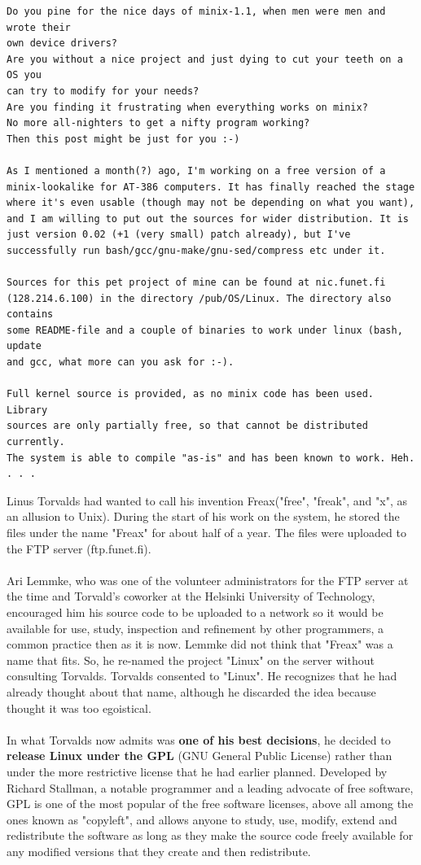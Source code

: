 \documentclass[11pt]{article}
\begin{document}
\begin{verbatim}
Do you pine for the nice days of minix-1.1, when men were men and wrote their
own device drivers? 
Are you without a nice project and just dying to cut your teeth on a OS you
can try to modify for your needs? 
Are you finding it frustrating when everything works on minix? 
No more all-nighters to get a nifty program working? 
Then this post might be just for you :-)

As I mentioned a month(?) ago, I'm working on a free version of a 
minix-lookalike for AT-386 computers. It has finally reached the stage where it's even usable (though may not be depending on what you want), and I am willing to put out the sources for wider distribution. It is just version 0.02 (+1 (very small) patch already), but I've successfully run bash/gcc/gnu-make/gnu-sed/compress etc under it.

Sources for this pet project of mine can be found at nic.funet.fi 
(128.214.6.100) in the directory /pub/OS/Linux. The directory also contains 
some README-file and a couple of binaries to work under linux (bash, update 
and gcc, what more can you ask for :-). 

Full kernel source is provided, as no minix code has been used. Library 
sources are only partially free, so that cannot be distributed currently. 
The system is able to compile "as-is" and has been known to work. Heh. . . .
\end{verbatim}
Linus Torvalds had wanted to call his invention Freax("free", "freak", and "x", as an allusion to Unix). During the start of his work on the system, he stored the files under the name "Freax" for about half of a year. The files were uploaded to the FTP server (ftp.funet.fi).\\
\\
Ari Lemmke, who was one of the volunteer administrators for the FTP server at the time and  Torvald's coworker at the Helsinki University of Technology, encouraged him his source code to be uploaded to a network so it would be available for use, study, inspection and refinement by other programmers, a common practice then as it is now. Lemmke did not think that "Freax" was a name that fits. So, he re-named the project "Linux" on the server without consulting Torvalds. Torvalds consented to "Linux". He recognizes that he had already thought about that name, although he discarded the idea because thought it was too egoistical.\\
\\
In what Torvalds now admits was \textbf{one of his best decisions}, he decided to \textbf{release Linux under the GPL} (GNU General Public License) rather than under the more restrictive license that he had earlier planned. Developed by Richard Stallman, a notable programmer and a leading advocate of free software, GPL is one of the most popular of the free software licenses, above all among the ones known as "copyleft", and allows anyone to study, use, modify, extend and redistribute the software as long as they make the source code freely available for any modified versions that they create and then redistribute.\\
\end{document}
